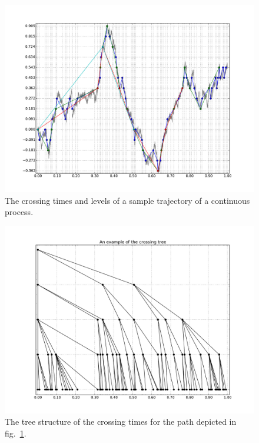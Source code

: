 \begin{figure}[htb]\begin{center}
    \includegraphics[width=6in]{images/sample_path}
    \caption{The crossing times and levels of a sample trajectory of a continuous process.}
\label{fig:sample_path}
\end{center}\end{figure}
\begin{figure}[htb]\begin{center}
    \includegraphics[width=6in]{images/sample_tree}
    \caption{The tree structure of the crossing times for the path depicted in fig.~\ref{fig:sample_path}.}
\label{fig:sample_tree}
\end{center}\end{figure}

